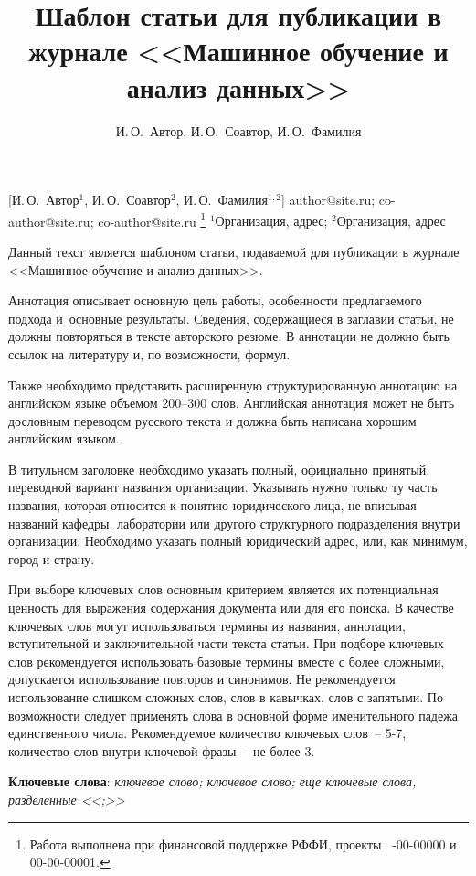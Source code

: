 \documentclass[12pt, twoside]{article}
\begin{document}
\title
    [Шаблон статьи для публикации] %
    {Шаблон статьи для публикации в журнале <<Машинное обучение и анализ данных>>}
\author
    [И.\,О.~Автор] %
    {И.\,О.~Автор, И.\,О.~Соавтор, И.\,О.~Фамилия} %
    [И.\,О.~Автор$^1$, И.\,О.~Соавтор$^2$, И.\,О.~Фамилия$^{1,2}$] %
\email
    {author@site.ru; co-author@site.ru;  co-author@site.ru}
\thanks
    {Работа выполнена при
     финансовой поддержке РФФИ, проекты \No\ -00-00000 и 00-00-00001.}
\organization
    {$^1$Организация, адрес; $^2$Организация, адрес}
\abstract
    {Данный текст является шаблоном статьи, подаваемой для публикации в журнале <<Машинное обучение и анализ данных>>.

    Аннотация описывает основную цель работы,
    особенности предлагаемого подхода и~основные результаты.
    Сведения, содержащиеся в заглавии статьи, не должны повторяться в тексте авторского резюме.
    В аннотации не должно быть ссылок на литературу и, по возможности, формул.
	
	Также необходимо представить расширенную структурированную аннотацию на английском языке объемом 200--300 слов.	
	Английская аннотация может не быть дословным переводом русского текста и должна быть написана хорошим английским языком.
	
	В титульном заголовке необходимо указать полный, официально принятый, переводной вариант названия организации.
	Указывать нужно только ту часть названия, которая относится к понятию юридического лица,
	не вписывая названий кафедры, лаборатории или другого структурного подразделения внутри организации.
	Необходимо указать полный юридический адрес, или, как минимум, город и страну.
 	
 	При выборе ключевых слов основным критерием является их потенциальная ценность для выражения содержания документа или для его поиска.
	В качестве ключевых слов могут использоваться термины из названия, аннотации, вступительной и заключительной части текста статьи.
 	При подборе ключевых слов рекомендуется использовать базовые термины вместе с более сложными, допускается использование повторов и синонимов.
	Не рекомендуется использование слишком сложных слов, слов в кавычках, слов с запятыми.
	По возможности следует применять слова в основной форме именительного падежа единственного числа.
	Рекомендуемое количество ключевых слов~-- 5-7, количество слов внутри ключевой фразы~-- не более 3.
	
\bigskip
\noindent
\textbf{Ключевые слова}: \emph {ключевое слово; ключевое слово; еще ключевые слова, разделенные <<;>>}
}
\end{document}
